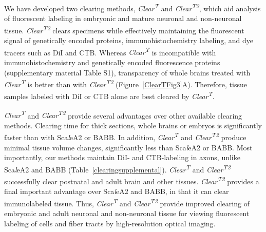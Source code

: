 We have developed two clearing methods, \emph{Clear\textsuperscript{T}} and \emph{Clear\textsuperscript{T2}}, which aid analysis of fluorescent labeling in embryonic and mature neuronal and non-neuronal tissue.
\emph{Clear\textsuperscript{T2}} clears specimens while effectively maintaining the fluorescent signal of genetically encoded proteins, immunohistochemistry labeling, and dye tracers such as DiI and CTB.
Whereas \emph{Clear\textsuperscript{T}} is incompatible with immunohistochemistry and genetically encoded fluorescence proteins (supplementary material Table S1), transparency of whole brains treated with \emph{Clear\textsuperscript{T}} is better than with \emph{Clear\textsuperscript{T2}} (Figure~\ref{ClearTFig3}A).
Therefore, tissue samples labeled with DiI or CTB alone are best cleared by \emph{Clear\textsuperscript{T}}.

\emph{Clear\textsuperscript{T}} and \emph{Clear\textsuperscript{T2}} provide several advantages over other available clearing methods.
Clearing time for thick sections, whole brains or embryos is significantly faster than with Sca\emph{l}eA2 or BABB.
In addition, \emph{Clear\textsuperscript{T}} and \emph{Clear\textsuperscript{T2}} produce minimal tissue volume changes, significantly less than Sca\emph{l}eA2 or BABB.
Most importantly, our methods maintain DiI- and CTB-labeling in axons, unlike Sca\emph{l}eA2 and BABB (Table~\ref{clearingsupplemental}).
\emph{Clear\textsuperscript{T}} and \emph{Clear\textsuperscript{T2}} successfully clear postnatal and adult brain and other tissues.
\emph{Clear\textsuperscript{T2}} provides a final important advantage over Sca\emph{l}eA2 and BABB, in that it can clear immunolabeled tissue.
Thus, \emph{Clear\textsuperscript{T}} and \emph{Clear\textsuperscript{T2}} provide improved clearing of embryonic and adult neuronal and non-neuronal tissue for viewing fluorescent labeling of cells and fiber tracts by high-resolution optical imaging.

